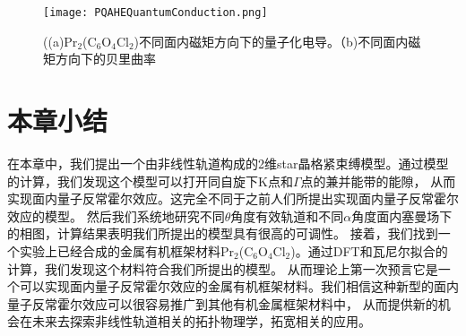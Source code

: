 \begin{figure}[htb]
  \centering
  \texttt{[image: PQAHEQuantumConduction.png]}
  \caption{((a)Pr$_2$(C$_6$O$_4$Cl$_2$)不同面内磁矩方向下的量子化电导。（b)不同面内磁矩方向下的贝里曲率}
  \label{PQAHEQuantumConduction}
  \note{}
\end{figure}

\section{本章小结}
在本章中，我们提出一个由非线性轨道构成的2维star晶格紧束缚模型。通过模型的计算，我们发现这个模型可以打开同自旋下K点和$\Gamma$点的兼并能带的能隙，
从而实现面内量子反常霍尔效应。这完全不同于之前人们所提出实现面内量子反常霍尔效应的模型。
然后我们系统地研究不同$\theta$角度有效轨道和不同$\alpha$角度面内塞曼场下的相图，计算结果表明我们所提出的模型具有很高的可调性。
接着，我们找到一个实验上已经合成的金属有机框架材料Pr$_2$(C$_6$O$_4$Cl$_2$)。通过DFT和瓦尼尔拟合的计算，我们发现这个材料符合我们所提出的模型。
从而理论上第一次预言它是一个可以实现面内量子反常霍尔效应的金属有机框架材料。我们相信这种新型的面内量子反常霍尔效应可以很容易推广到其他有机金属框架材料中，
从而提供新的机会在未来去探索非线性轨道相关的拓扑物理学，拓宽相关的应用。